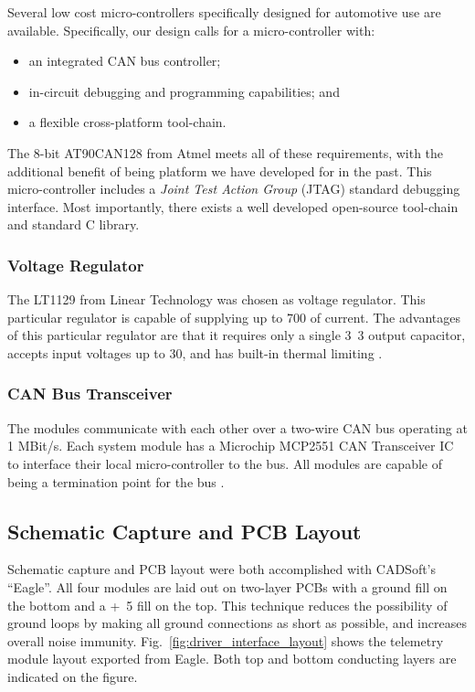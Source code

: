 Several low cost micro-controllers specifically designed for automotive use are available. Specifically, our design calls for a micro-controller with:

\begin{itemize}
  \item an integrated CAN bus controller;
  \item in-circuit debugging and programming capabilities; and
  \item a flexible cross-platform tool-chain.
\end{itemize}


The 8-bit AT90CAN128 from Atmel meets all of these requirements, with the additional benefit of being platform we have developed for in the past. This micro-controller includes a \emph{Joint Test Action Group} (JTAG) standard debugging interface. Most importantly, there exists a well developed open-source tool-chain and standard C library.

\subsubsection{Voltage Regulator}

The LT1129 from Linear Technology was chosen as voltage regulator. This particular regulator is capable of supplying up to \unit{700}{\milli\ampere} of current. The advantages of this particular regulator are that it requires only a single \unit{3.3}{\micro\farad} output capacitor, accepts input voltages up to \unit{30}{\volt}, and has built-in thermal limiting \cite{LTC1129}. 

\subsubsection{CAN Bus Transceiver}

The modules communicate with each other over a two-wire CAN bus operating at 1 MBit/s. Each system module has a Microchip MCP2551 CAN Transceiver IC to interface their local micro-controller to the bus. All modules are capable of being a termination point for the bus \cite{MCP2551}. 

\subsection{Schematic Capture and PCB Layout}

Schematic capture and PCB layout were both accomplished with CADSoft's ``Eagle''. All four modules are laid out on two-layer PCBs with a ground fill on the bottom and a \unit{+5}{\volt} fill on the top. This technique reduces the possibility of ground loops by making all ground connections as short as possible, and increases overall noise immunity. Fig.\ \ref{fig:driver_interface_layout} shows the telemetry module layout exported from Eagle. Both top and bottom conducting layers are indicated on the figure.

